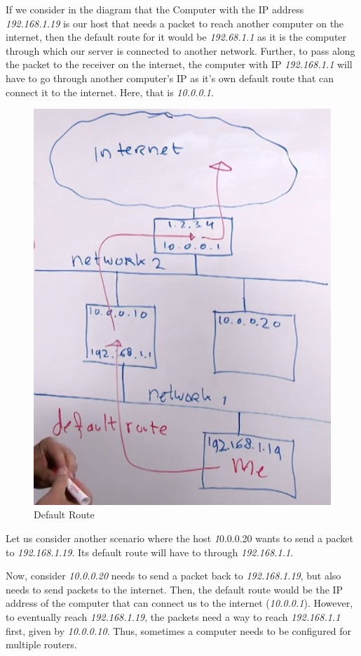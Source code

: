 If we consider in the diagram that the Computer with the IP address \textit{192.168.1.19} is our host that needs a packet to reach another computer on the internet, then the default route for it would be \textit{192.68.1.1} as it is the computer through which our server is connected to another network. Further, to pass along the packet to the receiver on the internet, the computer with IP \textit{192.168.1.1} will have to go through another computer's IP as it's own default route that can connect it to the internet. Here, that is \textit{10.0.0.1}.

\begin{figure}[H]
	\centering
	\includegraphics[height=0.9\linewidth]{"Mod1/chapters/1.9.a Default Route"}
	\caption{Default Route}
	\label{fig:1}
\end{figure}
\vspace{-5pt}

Let us consider another scenario where the host \textit10.0.0.20{} wants to send a packet to \textit{192.168.1.19}. Its default route will have to through \textit{192.168.1.1}. 

Now, consider \textit{10.0.0.20} needs to send a packet back to \textit{192.168.1.19}, but also needs to send packets to the internet. Then, the default route would be the IP address of the computer that can connect us to the internet (\textit{10.0.0.1}). However,  to eventually reach \textit{192.168.1.19}, the packets need a way to reach \textit{192.168.1.1} first, given by \textit{10.0.0.10}. Thus, sometimes a computer needs to be configured for multiple routers.

